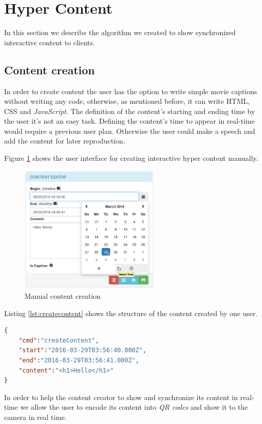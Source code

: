 \section{Hyper Content}
	In this section we describe the algorithm we created to show synchronized interactive content to clients.



	\subsection{Content creation}

	In order to create content the user has the option to write simple movie captions without writing any code, otherwise, as mentioned before, it can write \ac{HTML}, \ac{CSS} and \emph{JavaScript}. The definition of the content's starting and ending time by the user it's not an easy task. Defining the content's time to appear in real-time would require a previous user plan. Otherwise the user could make a speech and add the content for later reproduction.

	Figure \ref{fig:creation} shows the user interface for creating interactive hyper content manually.

	\begin{figure}[H]
		\centering
		\includegraphics[width=0.6\textwidth]{figures/edition.png}
		\caption{Manual content creation}
		\label{fig:creation}
	\end{figure}


	Listing \ref{lst:createcontent} shows the structure of the content created by one user.

\begin{minipage}{\linewidth}
\begin{lstlisting}[caption={Exampe of content created by one user},label={lst:createcontent},language=json]
{
	"cmd":"createContent",
	"start":"2016-03-29T03:56:40.000Z",
	"end":"2016-03-29T03:56:41.000Z",
	"content":"<h1>Hello</h1>"
}
\end{lstlisting}
\end{minipage}
	In order to help the content creator to show and synchronize its content in real-time we allow the user to encode its content into \emph{QR codes} and show it to the camera in real time.

